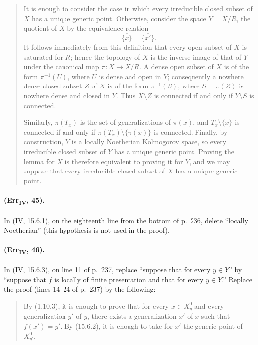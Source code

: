 {\begin{quote}
It is enough to consider the case in which every irreducible closed
subset of $X$ has a unique generic point.  Otherwise, consider the
space $Y=X/R$, the quotient of $X$ by the equivalence relation
\[
 \overline{\{x\}}=\overline{\{x'\}}.
\]
It follows immediately from this definition that every open subset of
$X$ is saturated for $R$; hence the topology of $X$ is the inverse
image of that of $Y$ under the canonical map $\pi:X\to X/R$.  A dense
open subset of $X$ is of the form $\pi^{-1}(U)$, where $U$ is dense and
open in $Y$; consequently a nowhere dense closed subset $Z$ of $X$ is
of the form $\pi^{-1}(S)$, where $S=\pi(Z)$ is nowhere dense and closed
in $Y$.  Thus $X\setminus Z$ is connected if and only if
$Y\setminus S$ is connected.

Similarly, $\pi(T_x)$ is the set of generalizations of $\pi(x)$, and
$T_x\setminus\{x\}$ is connected if and only if
$\pi(T_x)\setminus\{\pi(x)\}$ is connected.  Finally, by construction,
$Y$ is a locally Noetherian Kolmogorov space, so every irreducible
closed subset of $Y$ has a unique generic point.  Proving the lemma for
$X$ is therefore equivalent to proving it for $Y$, and we may suppose
that every irreducible closed subset of $X$ has a unique generic point.
\end{quote}

\paragraph{(Err\textsubscript{IV}, 45).}
In (IV, 15.6.1), on the eighteenth line from the bottom of p.~236,
delete ``locally Noetherian'' (this hypothesis is not used in the
proof).

\paragraph{(Err\textsubscript{IV}, 46).}
In (IV, 15.6.3), on line 11 of p.~237, replace ``suppose that for every
$y\in Y$'' by ``suppose that $f$ is locally of finite presentation and
that for every $y\in Y$.''  Replace the proof (lines 14--24 of p.~237)
by the following:

\begin{quote}
By (1.10.3), it is enough to prove that for every $x\in X_y^0$ and
every generalization $y'$ of $y$, there exists a generalization $x'$ of
$x$ such that $f(x')=y'$.  By (15.6.2), it is enough to take for $x'$
the generic point of $X_{y'}^0$.
\end{quote}

}

